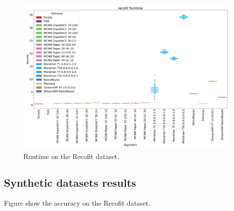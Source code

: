 \begin{figure}[H]
	\includegraphics[width=\linewidth]{figures/results/recofit_runtime.png}
	\caption{Runtime on the Recofit dataset.}
\end{figure}

\subsection{Synthetic datasets results}
Figure show the accuracy on the Recofit dataset.

